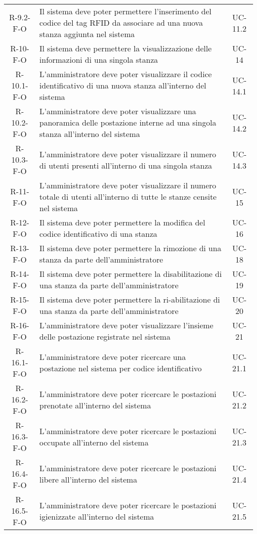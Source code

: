 \begin{longtable}{ c C{9.5cm} c }
    R-9.2-F-O & Il sistema deve poter permettere l'inserimento del codice del tag RFID da associare ad una nuova stanza aggiunta nel sistema& UC- 11.2\\
    R-10-F-O &  Il sistema deve permettere la visualizzazione delle informazioni di una singola stanza& UC- 14\\
    R-10.1-F-O &  L'amministratore deve poter visualizzare il codice identificativo di una nuova stanza all'interno del sistema& UC- 14.1\\
    R-10.2-F-O &  L'amministratore deve poter visualizzare una panoramica delle postazione interne ad una singola stanza all'interno del sistema& UC- 14.2\\
    R-10.3-F-O &  L'amministratore deve poter visualizzare il numero di utenti presenti all'interno di una singola stanza& UC- 14.3\\
    R-11-F-O &  L'amministratore deve poter visualizzare il numero totale di utenti all'interno di tutte le stanze censite nel sistema& UC- 15\\
    R-12-F-O &  Il sistema deve poter permettere la modifica del codice identificativo di una stanza& UC- 16\\
    R-13-F-O &  Il sistema deve poter permettere la rimozione di una stanza da parte dell'amministratore& UC- 18\\
    R-14-F-O &  Il sistema deve poter permettere la disabilitazione di una stanza da parte dell'amministratore& UC- 19\\
    R-15-F-O &  Il sistema deve poter permettere la ri-abilitazione di una stanza da parte dell'amministratore& UC- 20\\
    R-16-F-O & L'amministratore deve poter visualizzare l'insieme delle postazione registrate nel sistema& UC- 21\\
    R-16.1-F-O & L'amministratore deve poter ricercare una postazione nel sistema per codice identificativo& UC- 21.1\\
    R-16.2-F-O & L'amministratore deve poter ricercare le postazioni prenotate all'interno del sistema& UC- 21.2\\
    R-16.3-F-O & L'amministratore deve poter ricercare le postazioni occupate all'interno del sistema& UC- 21.3\\
    R-16.4-F-O & L'amministratore deve poter ricercare le postazioni libere all'interno del sistema& UC- 21.4\\
    R-16.5-F-O & L'amministratore deve poter ricercare le postazioni igienizzate all'interno del sistema& UC- 21.5\\

\end{longtable}
